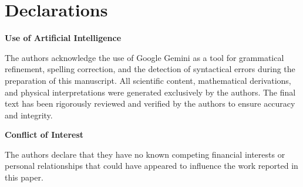 \documentclass[pdflatex,sn-mathphys-num]{sn-jnl}
\theoremstyle{thmstyleone}%
\theoremstyle{thmstyletwo}%
\theoremstyle{thmstylethree}%
\begin{document}
\section*{Declarations}

\textbf{Use of Artificial Intelligence}

The authors acknowledge the use of Google Gemini as a tool for grammatical
refinement, spelling correction, and the detection of syntactical errors during
the preparation of this manuscript. All scientific content, mathematical
derivations, and physical interpretations were generated exclusively by the
authors. The final text has been rigorously reviewed and verified by the authors
to ensure accuracy and integrity.

\textbf{Conflict of Interest}

The authors declare that they have no known competing financial interests or
personal relationships that could have appeared to influence the work reported
in this paper.


\nocite{*}
\end{document}
